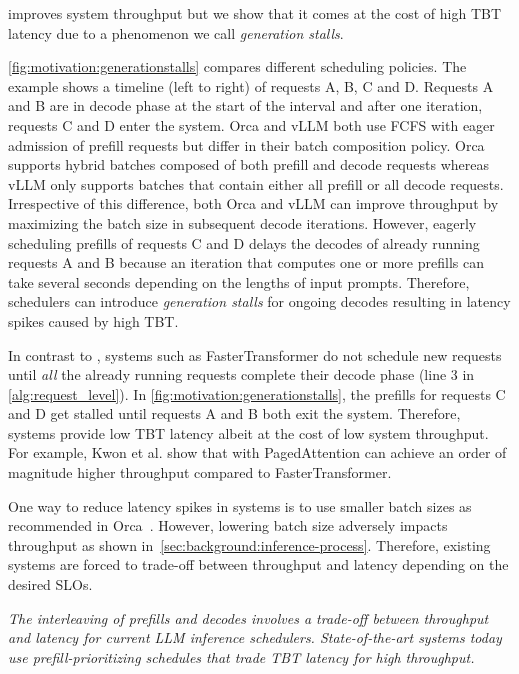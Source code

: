 \Ils improves system throughput but we show that it comes at the cost of high TBT latency due to a phenomenon we call \textit{generation stalls}.


\autoref{fig:motivation:generationstalls} compares different scheduling policies. The example shows a timeline (left to right) of requests A, B, C and D. Requests A and B are in decode phase at the start of the interval and after one iteration, requests C and D enter the system. Orca and vLLM both use FCFS \ils with eager admission of prefill requests %
but differ in their batch composition policy. Orca supports hybrid batches composed of both prefill and decode requests whereas vLLM only supports batches that contain either all prefill or all decode requests. Irrespective of this difference, both Orca and vLLM can improve throughput by maximizing the batch size in subsequent decode iterations. However, eagerly scheduling prefills of requests C and D delays the decodes of already running requests A and B because an iteration that computes one or more prefills can take several seconds depending on the lengths of input prompts. Therefore, \prefillprio schedulers can introduce \textit{generation stalls} for ongoing decodes resulting in latency spikes caused by high TBT.




In contrast to \ils, \rls systems such as FasterTransformer \cite{fastertransformer} do not schedule new requests until \textit{all} the already running requests complete their decode phase (line 3 in \autoref{alg:request_level}). In \autoref{fig:motivation:generationstalls}, the prefills for requests C and D get stalled until requests A and B both exit the system. Therefore, \decodeprio systems provide low TBT latency albeit at the cost of low system throughput. For example, Kwon et al. \cite{vllmsosp} show that \ils with PagedAttention can achieve an order of magnitude higher throughput compared to FasterTransformer.

One way to reduce latency spikes in \ils systems is to use smaller batch sizes as recommended in Orca~\cite{orca}. However, lowering batch size adversely impacts throughput as shown in~\autoref{sec:background:inference-process}. Therefore, existing systems are forced to trade-off between throughput and latency depending on the desired SLOs.


 \textit{The interleaving of prefills and decodes involves a trade-off between throughput and latency for current LLM inference schedulers. State-of-the-art systems today use prefill-prioritizing schedules that trade TBT latency for high throughput.}





